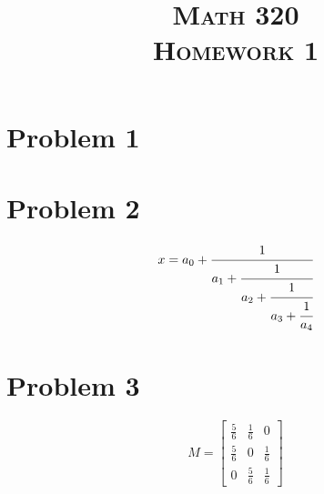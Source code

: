 \documentclass{article}
\title{
    \textsc{Math 320\\Homework 1}
}
\date{}
\begin{document}
\maketitle

\section*{Problem 1}
\lipsum[1]

\section*{Problem 2}
\begin{equation}
  x = a_0 + \cfrac{1}{a_1
          + \cfrac{1}{a_2
          + \cfrac{1}{a_3 + \cfrac{1}{a_4} } } }
\end{equation}
\lipsum[2]

\section*{Problem 3}
\begin{equation}
M = \begin{bmatrix}
       \frac{5}{6} & \frac{1}{6} & 0           \\[0.3em]
       \frac{5}{6} & 0           & \frac{1}{6} \\[0.3em]
       0           & \frac{5}{6} & \frac{1}{6}
     \end{bmatrix}
\end{equation}
\end{document}
